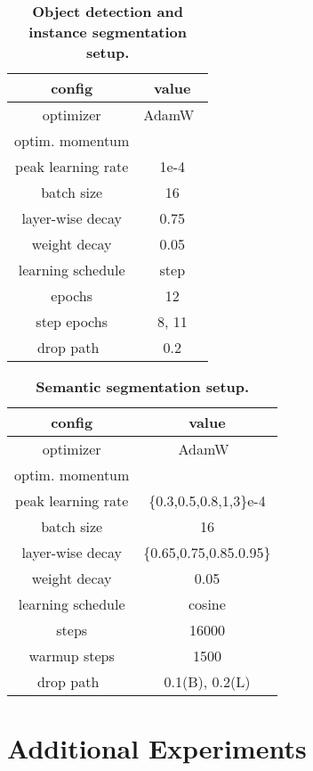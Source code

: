 \documentclass[10pt,twocolumn,letterpaper]{article}
\begin{document}
\begin{table}[t]
    \begin{center}
    \setlength{\tabcolsep}{7.0mm}
	\begin{tabular}{c|c}
	\toprule
		config & value \\
		\hline
		optimizer & AdamW~\cite{adamw}\\
		optim. momentum &  \\
		peak learning rate & 1e-4 \\
		batch size & 16 \\
		layer-wise decay & 0.75 \\
		weight decay & 0.05 \\
		learning schedule & step \\
		epochs & 12 \\
		step epochs & 8, 11 \\
		drop path~\cite{droppath} & 0.2 \\
	\bottomrule
	\end{tabular}
 \end{center}
	\caption{\textbf{Object detection and instance segmentation setup.}}
	\label{tab:app:det-iseg}
\end{table}


\begin{table}[t]
    \begin{center}
    \setlength{\tabcolsep}{6.0mm}
	\begin{tabular}{c|c}
	\toprule
	    config & value \\
		\hline
		optimizer & AdamW~\cite{adamw}\\
		optim. momentum &  \\
		peak learning rate & \{0.3,0.5,0.8,1,3\}e-4 \\
		batch size & 16 \\
		layer-wise decay & \{0.65,0.75,0.85.0.95\}\\
		weight decay & 0.05\\
		learning schedule & cosine \\
		steps & 16000 \\
		warmup steps & 1500 \\
		drop path~\cite{droppath} & 0.1(B), 0.2(L) \\
	\bottomrule
	\end{tabular}
 \end{center}
	\caption{\textbf{Semantic segmentation setup.}}
	\label{tab:app:seg}
\end{table}

\section{Additional Experiments}
\end{document}
